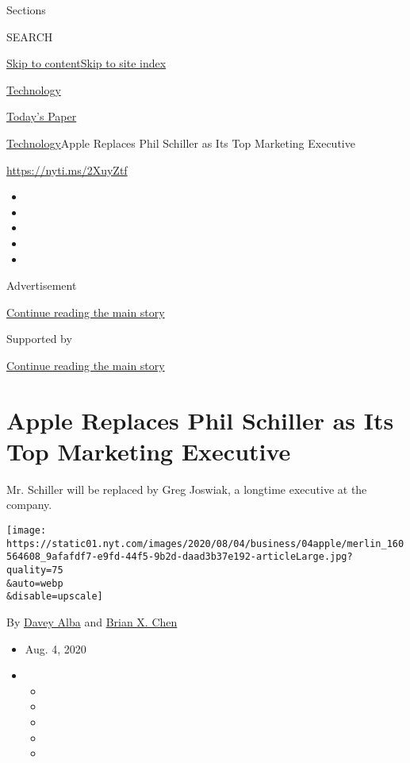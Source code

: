 Sections

SEARCH

\protect\hyperlink{site-content}{Skip to
content}\protect\hyperlink{site-index}{Skip to site index}

\href{https://www.nytimes.com/section/technology}{Technology}

\href{https://myaccount.nytimes.com/auth/login?response_type=cookie\&client_id=vi}{}

\href{https://www.nytimes.com/section/todayspaper}{Today's Paper}

\href{/section/technology}{Technology}\textbar{}Apple Replaces Phil
Schiller as Its Top Marketing Executive

\url{https://nyti.ms/2XuyZtf}

\begin{itemize}
\item
\item
\item
\item
\item
\end{itemize}

Advertisement

\protect\hyperlink{after-top}{Continue reading the main story}

Supported by

\protect\hyperlink{after-sponsor}{Continue reading the main story}

\hypertarget{apple-replaces-phil-schiller-as-its-top-marketing-executive}{%
\section{Apple Replaces Phil Schiller as Its Top Marketing
Executive}\label{apple-replaces-phil-schiller-as-its-top-marketing-executive}}

Mr. Schiller will be replaced by Greg Joswiak, a longtime executive at
the company.

\texttt{[image: https://static01.nyt.com/images/2020/08/04/business/04apple/merlin\_160564608\_9afafdf7-e9fd-44f5-9b2d-daad3b37e192-articleLarge.jpg?quality=75\\\&auto=webp\\\&disable=upscale]}

By \href{https://www.nytimes.com/by/davey-alba}{Davey Alba} and
\href{https://www.nytimes.com/by/brian-x-chen}{Brian X. Chen}

\begin{itemize}
\item
  Aug. 4, 2020
\item
  \begin{itemize}
  \item
  \item
  \item
  \item
  \item
  \end{itemize}
\end{itemize}


